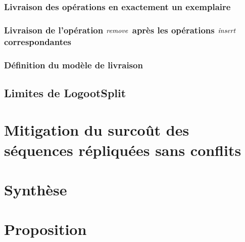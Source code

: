 \subsubsection{Livraison des opérations en exactement un exemplaire}


\subsubsection{Livraison de l'opération $\mathit{remove}$ après les opérations $\mathit{insert}$ correspondantes}


\subsubsection{Définition du modèle de livraison}


\subsection{Limites de LogootSplit}


\section{Mitigation du surcoût des séquences répliquées sans conflits}


\section{Synthèse}


\section{Proposition}

